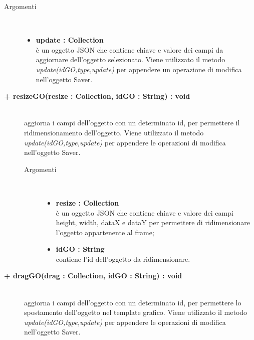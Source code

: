 \begin{description}
\begin{description}
\begin{description}
\begin{description}
			\item[Argomenti] \hfill \\
				\begin{itemize}
						\item \textbf{update : Collection			} \hfill \\
					è un oggetto JSON che contiene chiave e valore dei campi da aggiornare dell'oggetto selezionato. Viene utilizzato il metodo \textit{update(idGO,type,update)} per appendere un operazione di modifica nell'oggetto Saver.
				\end{itemize}

\end{description}

\end{description}

\begin{description}
		\item[\textbf{\color{blue}+ resizeGO(resize : Collection, idGO : String) : void			}] \hfill \\
			aggiorna i campi dell'oggetto con un determinato id, per permettere il ridimensionamento dell'oggetto. Viene utilizzato il metodo \textit{update(idGO,type,update)} per appendere le operazioni di modifica nell'oggetto Saver.    

\begin{description}
			\item[Argomenti] \hfill \\
				\begin{itemize}
					\item \textbf{resize : Collection			} \hfill \\
					è un oggetto JSON che contiene chiave e valore dei campi height, width, dataX e dataY per permettere di ridimensionare l'oggetto appartenente al frame;
					\item \textbf{idGO : String			} \hfill \\
					contiene l'id dell'oggetto da ridimensionare.
				\end{itemize}

\end{description}

\end{description}

\begin{description}
		\item[\textbf{\color{blue}+ dragGO(drag : Collection, idGO : String) : void			}] \hfill \\
			aggiorna i campi dell'oggetto con un determinato id, per permettere lo spostamento dell'oggetto nel template grafico. Viene utilizzato il metodo \textit{update(idGO,type,update)} per appendere le operazioni di modifica nell'oggetto Saver.    


\end{description}
\end{description}
\end{description}
